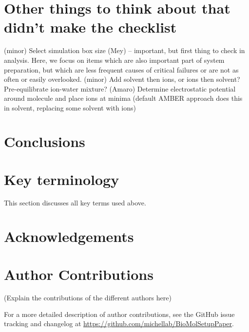 \documentclass[9pt,bestpractices]{livecoms}
\newcommand{\githubrepository}{\url{https://github.com/michellab/BioMolSetupPaper}}  %
\begin{document}
\section{Other things to think about that didn't make the checklist}
(minor) Select simulation box size (Mey) -- important, but first thing to check in analysis.%
Here, we focus on items which are also important part of system preparation, but which are less frequent causes of critical failures or are not as often or easily overlooked.
(minor) Add solvent then ions, or ions then solvent? Pre-equilibrate ion-water mixture? (Amaro)%
Determine electrostatic potential around molecule and place ions at minima (default AMBER approach does this in solvent, replacing some solvent with ions)%
%
\section{Conclusions}
%
\section*{Key terminology}
This section discusses all key terms used above.%
%
\section*{Acknowledgements}
%
\section*{Author Contributions}
%

(Explain the contributions of the different authors here)

For a more detailed description of author contributions,
see the GitHub issue tracking and changelog at \githubrepository.
\end{document}
